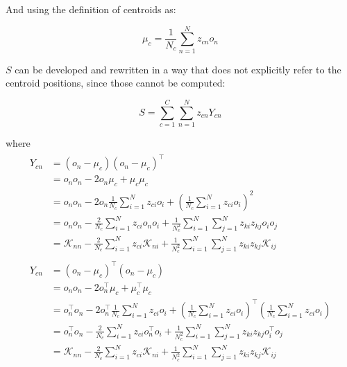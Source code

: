 \documentclass[natbib,smallextended]{svjour3}
\providecommand{\DIFaddbegin}{} %
\providecommand{\DIFaddend}{} %
\providecommand{\DIFdelbegin}{} %
\providecommand{\DIFdelend}{} %
\begin{document}
And using the definition of centroids as:

\[
\mu_c = \frac{1}{N_c}\sum_{n=1}^{N}z_{cn}o_n
\]

$S$ can be developed and rewritten in a way that does not explicitly refer to the centroid positions, since those cannot be computed:

\[
S = \sum_{c=1}^{C} \sum_{n=1}^{N} z_{cn} Y_{cn}
\]

where
\begin{align}
\DIFdelbegin \begin{split}
Y_{cn} & =  \left(o_n-\mu_c\right)\left(o_n-\mu_c\right)^\top \\
       & =  o_no_n - 2 o_n\mu_c + \mu_c\mu_c \\
      & =  o_no_n - 2 o_n\frac{1}{N_c} \sum_{i=1}^{N} z_{ci} o_i +
       	 \left(\frac{1}{N_c} \sum_{i=1}^{N} z_{ci} o_i\right)^2 \\ %
      & =  o_no_n - \frac{2}{N_c} \sum_{i=1}^{N} z_{ci} o_no_i +
       	 \frac{1}{N_c^2} \sum_{i=1}^{N} \sum_{j=1}^{N} z_{ki} z_{kj} o_io_j \\
      & =  \mathcal{K}_{nn} - \frac{2}{N_c} \sum_{i=1}^{N} z_{ci} \mathcal{K}_{ni} +
         \frac{1}{N_c^2} \sum_{i=1}^{N} \sum_{j=1}^{N} z_{ki} z_{kj} \mathcal{K}_{ij} %
 \end{split}
\DIFdelend \\
 \DIFaddbegin  \begin{split}
Y_{cn} & =  \left(o_n-\mu_c\right)^\top\left(o_n-\mu_c\right) \\
       & =  o_no_n - 2 o_n^\top \mu_c + \mu_c^\top \mu_c \\
       & =  o_n^\top o_n - 2 o_n^\top \frac{1}{N_c} \sum_{i=1}^{N} z_{ci} o_i +
       	 \left(\frac{1}{N_c} \sum_{i=1}^{N} z_{ci} o_i\right)^\top
         \left(\frac{1}{N_c} \sum_{i=1}^{N} z_{ci} o_i\right)\\
       & =  o_n^\top o_n - \frac{2}{N_c} \sum_{i=1}^{N} z_{ci} o_n^\top o_i +
       	 \frac{1}{N_c^2} \sum_{i=1}^{N} \sum_{j=1}^{N} z_{ki} z_{kj} o_i^\top o_j \\
       & =  \mathcal{K}_{nn} - \frac{2}{N_c} \sum_{i=1}^{N} z_{ci} \mathcal{K}_{ni} +
         \frac{1}{N_c^2} \sum_{i=1}^{N} \sum_{j=1}^{N} z_{ki} z_{kj} \mathcal{K}_{ij} \label{eq:yki}
\end{split}
\DIFaddend \end{align}
\end{document}
